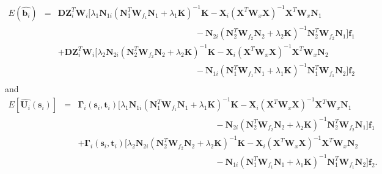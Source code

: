 \documentclass[review]{elsarticle}
\begin{document}
\begin{eqnarray*}
E(\hat {\boldsymbol b_i}) 
&=& 
\boldsymbol D \boldsymbol Z_i^T \boldsymbol W_i 
[
\lambda_1 \boldsymbol N_{1i}
 (\boldsymbol N_1^T \boldsymbol W_{f_1}  \boldsymbol N_1 + \lambda_1 \boldsymbol K)^{-1}  
\boldsymbol K
-  
\boldsymbol X_i(\boldsymbol X^T  \boldsymbol W_x \boldsymbol X )^{-1} \boldsymbol X^T  \boldsymbol W_x  \boldsymbol N_1
\\
&& 
\quad\quad\quad\quad \quad \quad \quad \quad \quad \quad \quad \quad \quad \quad\quad \quad
-
 \boldsymbol N_{2i}
(\boldsymbol N_2^T \boldsymbol W_{f_2}  \boldsymbol N_2 + \lambda_2 \boldsymbol K)^{-1}  \boldsymbol N_2^T \boldsymbol W_{f_2} 
\boldsymbol N_{1} 
 ]
  \boldsymbol f_1  
\\
&& 
+
\boldsymbol D \boldsymbol Z_i^T \boldsymbol W_i 
[
\lambda_2 \boldsymbol N_{2i}
(\boldsymbol N_2^T \boldsymbol W_{f_2}  \boldsymbol N_2 + \lambda_2 \boldsymbol K)^{-1}
  \boldsymbol K
-  
\boldsymbol X_i(\boldsymbol X^T  \boldsymbol W_x \boldsymbol X )^{-1} \boldsymbol X^T  \boldsymbol W_x  \boldsymbol N_2
\\
&& 
\quad\quad\quad\quad \quad \quad \quad \quad \quad \quad \quad \quad \quad \quad\quad \quad
-
 \boldsymbol N_{1i}
 (\boldsymbol N_1^T \boldsymbol W_{f_1}  \boldsymbol N_1 + \lambda_1 \boldsymbol K)^{-1}  
\boldsymbol N_1^T \boldsymbol W_{f_1}
\boldsymbol N_2
 ]
  \boldsymbol f_2 \\
  \end{eqnarray*}
and
 \begin{eqnarray*}
E\left[
\hat {\boldsymbol U_i}(\boldsymbol s_i) 
\right] 
&=& 
\boldsymbol \Gamma_i(\boldsymbol s_i, \boldsymbol t_i) 
[
\lambda_1 \boldsymbol N_{1i}
 (\boldsymbol N_1^T \boldsymbol W_{f_1}  \boldsymbol N_1 + \lambda_1 \boldsymbol K)^{-1}  
\boldsymbol K
-  
\boldsymbol X_i(\boldsymbol X^T  \boldsymbol W_x \boldsymbol X )^{-1} \boldsymbol X^T  \boldsymbol W_x  \boldsymbol N_1
\\
&&
\quad\quad \quad \quad \quad \quad \quad\quad \quad \quad \quad \quad\quad \quad\quad\quad
-
 \boldsymbol N_{2i}
(\boldsymbol N_2^T \boldsymbol W_{f_2}  \boldsymbol N_2 + \lambda_2 \boldsymbol K)^{-1}  \boldsymbol N_2^T \boldsymbol W_{f_2} 
\boldsymbol N_{1} 
 ]
  \boldsymbol f_1  
\\
&&
+
\boldsymbol \Gamma_i(\boldsymbol s_i, \boldsymbol t_i) 
[
\lambda_2 \boldsymbol N_{2i}
(\boldsymbol N_2^T \boldsymbol W_{f_2}  \boldsymbol N_2 + \lambda_2 \boldsymbol K)^{-1}
  \boldsymbol K
-  
\boldsymbol X_i(\boldsymbol X^T  \boldsymbol W_x \boldsymbol X )^{-1} \boldsymbol X^T  \boldsymbol W_x  \boldsymbol N_2
\\
&& 
\quad \quad \quad \quad \quad \quad \quad \quad \quad \quad \quad\quad\quad\quad\quad\quad
-
 \boldsymbol N_{1i}
 (\boldsymbol N_1^T \boldsymbol W_{f_1}  \boldsymbol N_1 + \lambda_1 \boldsymbol K)^{-1}  
\boldsymbol N_1^T \boldsymbol W_{f_1}
\boldsymbol N_2
 ]
  \boldsymbol f_2 .
  \end{eqnarray*}
\end{document}

